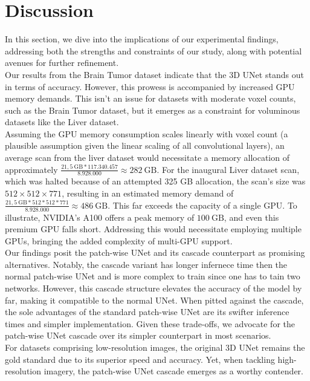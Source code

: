 \chapter{Discussion}
In this section, we dive into the implications of our experimental findings, addressing both the strengths and constraints of our study, along with potential avenues for further refinement.\\
Our results from the Brain Tumor dataset indicate that the 3D UNet stands out in terms of accuracy. However, this prowess is accompanied by increased GPU memory demands.
This isn't an issue for datasets with moderate voxel counts, such as the Brain Tumor dataset, but it emerges as a constraint for voluminous datasets like the Liver dataset.\\
Assuming the GPU memory consumption scales linearly with voxel count (a plausible assumption given the linear scaling of all convolutional layers),
an average scan from the liver dataset would necessitate a memory allocation of approximately $\frac{21,5~\text{GB} * 117.340.457}{8.928.000}\approx282~\text{GB}$.
For the inaugural Liver dataset scan, which was halted because of an attempted 325 GB allocation, the scan's size was $512\times512\times771$,
resulting in an estimated memory demand of $\frac{21,5~\text{GB} * 512*512*771}{8.928.000}\approx486~\text{GB}$. This far exceeds the capacity of a single GPU.
To illustrate, NVIDIA's A100 offers a peak memory of $100~\text{GB}$, and even this premium GPU falls short. Addressing this would necessitate employing multiple GPUs,
bringing the added complexity of multi-GPU support.\\
Our findings posit the patch-wise UNet and its cascade counterpart as promising alternatives.
Notably, the cascade variant has longer infernece time then the normal patch-wise UNet and is more complex to train since one has to tain two networks. However,
this cascade structure elevates the accuracy of the model by far, making it compatible to the normal UNet. When pitted against the cascade,
the sole advantages of the standard patch-wise UNet are its swifter inference times and simpler implementation. Given these trade-offs,
we advocate for the patch-wise UNet cascade over its simpler counterpart in most scenarios.\\
For datasets comprising low-resolution images, the original 3D UNet remains the gold standard due to its superior speed and accuracy.
Yet, when tackling high-resolution imagery, the patch-wise UNet cascade emerges as a worthy contender.\\
